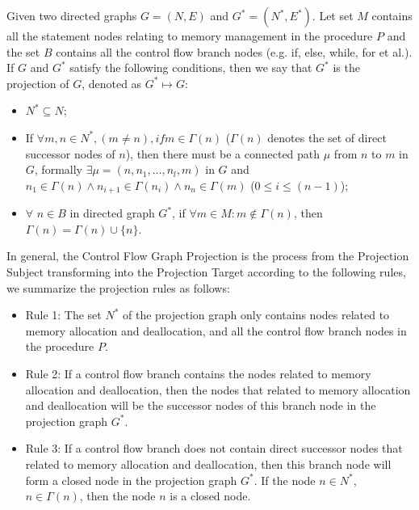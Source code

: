 \begin{definition}
Given two directed graphs $G = (N, E)$ and $G^* = (N^*, E^*)$. Let set $M$ contains all the statement nodes relating to memory management in the procedure $P$ and the set $B$ contains all the control flow branch nodes (e.g. {\sf if}, {\sf else}, {\sf while}, {\sf for} et al.). If $G$ and $G^*$ satisfy the following conditions, then we say that $G^*$ is the projection of $G$, denoted as $G^* \mapsto G$:
\begin{itemize}
\item
$N^*\subseteq N$;
\item
If $\forall m,n\in N^*,(m\neq n), if m\in \Gamma(n)$ ($\Gamma(n)$ denotes the set of direct successor nodes of $n$), then there must be a connected path $\mu$ from $n$ to $m$ in $G$, formally $\exists \mu=(n, n_1,\ldots,n_l,m)$ in $G$ and $n_1\in\Gamma(n) \land  n_{i+1}\in\Gamma(n_i) \land n_n\in \Gamma(m)$ ($0\leq i\leq (n-1)$);
\item
$\forall$ $n\in B$ in directed graph $G^*$, if $\forall m\in M: m\not\in \Gamma(n)$, then $\Gamma(n)=\Gamma(n)\cup\{n\}$. 
\end{itemize}
\end{definition}

In general, the Control Flow Graph Projection is the process from the Projection Subject transforming into the Projection Target according to the following rules, we summarize the projection rules as follows: 
\begin{itemize}
\item 
Rule 1: The set $N^*$ of the projection graph only contains nodes related to memory allocation and deallocation, and all the control flow branch nodes in the procedure $P$.
\item
Rule 2: If a control flow branch contains the nodes related to memory allocation and deallocation, then the nodes that related to memory allocation and deallocation will be the successor nodes of this branch node in the projection graph $G^*$.
\item
Rule 3: If a control flow branch does not contain direct successor nodes that related to memory allocation and deallocation, then this branch node will form a closed node in the projection graph $G^*$. 
If the node $n\in N^*$, $n\in \Gamma(n)$, then the node $n$ is a closed node.
\end{itemize}



